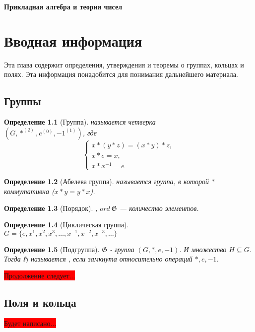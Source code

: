 \documentclass[a4paper,14pt, draft]{report}
\newtheorem{definition}{Определение}
\begin{document}
\begin{titlepage}
\begin{center}
\vspace{5em}

\textbf{\large Прикладная алгебра и теория чисел}
\end{center}
\end{titlepage}
\renewcommand\contentsname{Оглавление}
\setcounter{page}{2}
\tableofcontents\newpage
\chapter{Вводная информация}
Эта глава содержит определения, утверждения и теоремы о группах, кольцах и полях. Эта информация понадобится для понимания дальнейшего материала.
\section{Группы}
\begin{definition}[Группа]
 называется четверка\\$(G, *^{(2)}, e^{(0)}, -1^{(1)})$, где
\[
    \begin{cases}
        x * (y * z) = (x * y) * z,\\
        x * e = x,\\
        x * x^{-1} = e
    \end{cases}
\]
\end{definition}
\begin{definition}[Абелева группа]
 называется группа, в которой $*$ коммутативна ($x * y = y * x$).
\end{definition}
\begin{definition}[Порядок]
, $ord~\mathfrak{G}$ --- количество элементов.
\end{definition}
\begin{definition}[Циклическая группа]
~\\$G = \{e, x^1, x^2, x^3, \ldots, x^{-1}, x^{-2}, x^{-3}, \ldots\}$
\end{definition}
\begin{definition}[Подгруппа]
$\mathfrak{G}$ - группа $(G, *, e, -1)$. И множество $H \subseteq G$. Тогда $\mathfrak{H}$ называется , если замкнута относительно операций $*, e, -1$.
\end{definition}
\colorbox{red}{Продолжение следует...}
\section{Поля и кольца}
\colorbox{red}{Будет написано...}
\end{document}

